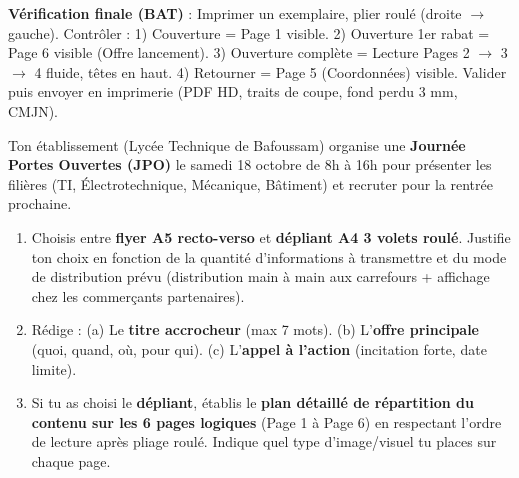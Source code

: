 \documentclass[11pt]{article}
\begin{document}
\begin{exoresolu}
\begin{itemize}
\end{itemize}
\textbf{Vérification finale (BAT)} : Imprimer un exemplaire, plier roulé (droite $\rightarrow$ gauche). Contrôler : 1) Couverture = Page 1 visible. 2) Ouverture 1er rabat = Page 6 visible (Offre lancement). 3) Ouverture complète = Lecture Pages 2 $\rightarrow$ 3 $\rightarrow$ 4 fluide, têtes en haut. 4) Retourner = Page 5 (Coordonnées) visible. Valider puis envoyer en imprimerie (PDF HD, traits de coupe, fond perdu 3 mm, CMJN).
\end{exoresolu}

\begin{exercice}
Ton établissement (Lycée Technique de Bafoussam) organise une \textbf{Journée Portes Ouvertes (JPO)} le samedi 18 octobre de 8h à 16h pour présenter les filières (TI, Électrotechnique, Mécanique, Bâtiment) et recruter pour la rentrée prochaine.
\begin{enumerate}
\item Choisis entre \textbf{flyer A5 recto-verso} et \textbf{dépliant A4 3 volets roulé}. Justifie ton choix en fonction de la quantité d'informations à transmettre et du mode de distribution prévu (distribution main à main aux carrefours + affichage chez les commerçants partenaires).
\item Rédige : (a) Le \textbf{titre accrocheur} (max 7 mots). (b) L'\textbf{offre principale} (quoi, quand, où, pour qui). (c) L'\textbf{appel à l'action} (incitation forte, date limite).
\item Si tu as choisi le \textbf{dépliant}, établis le \textbf{plan détaillé de répartition du contenu sur les 6 pages logiques} (Page 1 à Page 6) en respectant l'ordre de lecture après pliage roulé. Indique quel type d'image/visuel tu places sur chaque page.
\end{enumerate}
\end{exercice}
\end{document}
